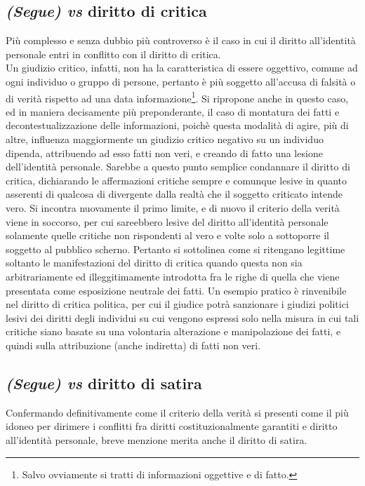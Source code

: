 \subsection{\textit{(Segue) vs} diritto di critica}
Più complesso e senza dubbio più controverso è il caso in cui il diritto all'identità personale entri in conflitto con il diritto di critica.
\\Un giudizio critico, infatti, non ha la caratteristica di essere oggettivo, comune ad ogni individuo o gruppo di persone, pertanto è più soggetto all'accusa di falsità o di verità rispetto ad una data informazione\footnote{Salvo ovviamente si tratti di informazioni oggettive e di fatto.}.
Si ripropone anche in questo caso, ed in maniera decisamente più preponderante, il caso di montatura dei fatti e decontestualizzazione delle informazioni, poichè questa modalità di agire, più di altre, influenza maggiormente un giudizio critico negativo su un individuo dipenda, attribuendo ad esso fatti non veri, e creando di fatto una lesione dell'identità personale. 
Sarebbe a questo punto semplice condannare il diritto di critica, dichiarando le affermazioni critiche sempre e comunque lesive in quanto asserenti di qualcosa di divergente dalla realtà che il soggetto criticato intende vero. Si incontra nuovamente il primo limite, e di nuovo il criterio della verità viene in soccorso, per cui sareebbero lesive del diritto all'identità personale solamente quelle critiche non rispondenti al vero e volte solo a sottoporre il soggetto al pubblico scherno. Pertanto si sottolinea come si ritengano legittime soltanto le manifestazioni del diritto di critica quando questa non sia arbitrariamente ed illeggitimamente introdotta fra le righe di quella che viene presentata come esposizione neutrale dei fatti.
Un esempio pratico è rinvenibile nel diritto di critica politica, per cui il giudice potrà sanzionare i giudizi politici lesivi dei diritti degli individui su cui vengono espressi solo nella misura in cui tali critiche siano basate su una volontaria alterazione e manipolazione dei fatti, e quindi sulla attribuzione (anche indiretta) di fatti non veri.
\subsection{\textit{(Segue) vs} diritto di satira}
Confermando definitivamente come il criterio della verità si presenti come il più idoneo per dirimere i conflitti fra diritti costituzionalmente garantiti e diritto all'identità personale, breve menzione merita anche il diritto di satira.

